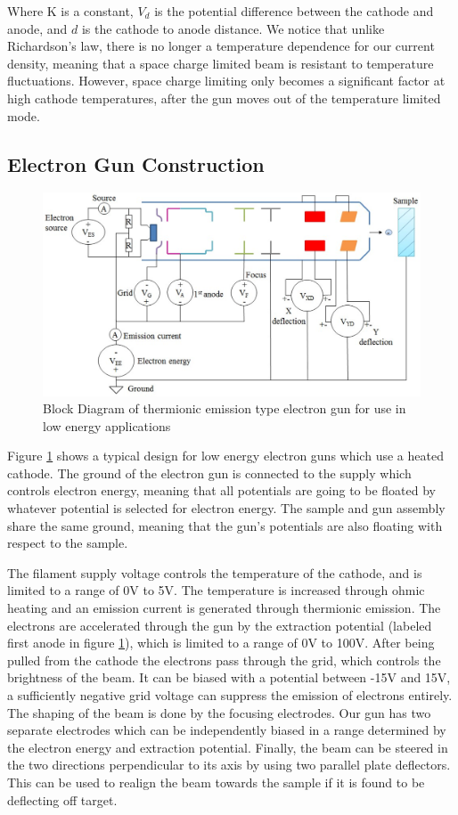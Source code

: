 Where K is a constant, $V_d$ is the potential difference between the cathode and anode, and $d$ is the cathode to anode distance.
We notice that unlike Richardson's law, there is no longer a temperature dependence for our current density, meaning that a space charge limited
beam is resistant to temperature fluctuations. However, space charge limiting only becomes a significant factor at high cathode temperatures, 
after the gun moves out of the temperature limited mode.

\clearpage
\subsection{Electron Gun Construction}

\begin{figure}[h!]
  \centering
  \includegraphics[width=0.85\linewidth]{../Assets/Gun diagram.png}
  \caption{Block Diagram of thermionic emission type electron gun for use in low energy applications\cite{gina_2012}}
  \label{fig:egun}
\end{figure}

Figure \ref{fig:egun} shows a typical design for low energy electron guns which use a heated cathode. The ground of the electron gun is connected 
to the supply which controls electron energy, meaning that all potentials are going to be floated by whatever potential is selected for electron energy. 
The sample and gun assembly share the same ground, meaning that the gun's potentials are also floating with respect to the sample. 

The filament supply voltage controls the temperature of the cathode, and is limited to a range of 0V to 5V. The temperature is increased through ohmic heating and an emission 
current is generated through thermionic emission. The electrons are accelerated through the gun by the extraction potential (labeled first anode in figure \ref{fig:egun}),
which is limited to a range of 0V to 100V. After being pulled from the cathode the electrons pass through the grid, which controls the brightness of the beam. 
It can be biased with a potential between -15V and 15V, a sufficiently negative grid voltage can suppress the emission of electrons entirely. The shaping
of the beam is done by the focusing electrodes. Our gun has two separate electrodes which can be independently biased in a range determined by the electron 
energy and extraction potential. Finally, the beam can be steered in the two directions perpendicular to its axis by using two parallel plate deflectors. 
This can be used to realign the beam towards the sample if it is found to be deflecting off target. 

